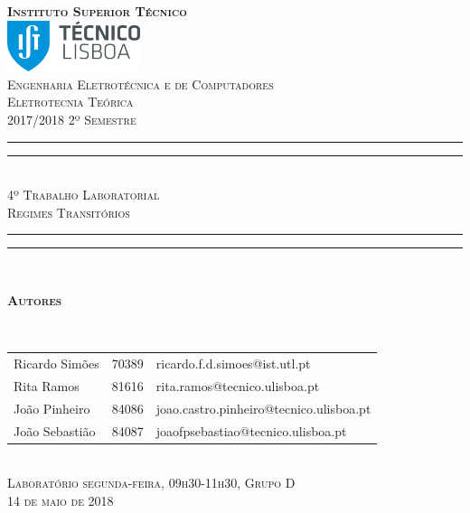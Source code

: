 \documentclass[a4paper, titlepage, portuguese]{article}
\begin{document}
	\begin{titlepage}
		\center
		\textsc{\bfseries\LARGE Instituto Superior Técnico}\\[1cm] %
		\includegraphics[height=1.5cm]{IST_Logo.pdf}\\[2.5cm]

		\textsc{\Large Engenharia Eletrotécnica e de Computadores}\\[0.5cm] %
		\textsc{\Large Eletrotecnia Teórica}\\[0.5cm] %
		\textsc{\large 2017/2018 2º Semestre}\\[2cm]

		\rule{\textwidth}{1.6pt}\vspace*{-\baselineskip}\vspace*{2pt} %
		\rule{\textwidth}{0.4pt}\\[\baselineskip] %
			\textsc{\Huge 4º Trabalho Laboratorial}\\[0.2cm]
			\bigskip
			\textsc{\Large Regimes Transitórios}\\[0.2cm]
		\rule{\textwidth}{0.4pt}\vspace*{-\baselineskip}\vspace{3.2pt} %
		\rule{\textwidth}{1.6pt}\\[6cm]

		\begin{minipage}{0.9\textwidth}
			\begin{flushleft} \large
				\begin{Large}\bfseries\textsc{Autores}\end{Large}\\[0.4cm]
				\begin{tabular}{l l l}
					Ricardo Simões	& 70389 & \normalsize ricardo.f.d.simoes@ist.utl.pt \\
					Rita Ramos			& 81616 & \normalsize rita.ramos@tecnico.ulisboa.pt \\
					João Pinheiro		& 84086 & \normalsize joao.castro.pinheiro@tecnico.ulisboa.pt \\
					João Sebastião	& 84087 & \normalsize joaofpsebastiao@tecnico.ulisboa.pt \\
				\end{tabular}
			\end{flushleft}
		\end{minipage}\\[0.5cm]

		\large \textsc{Laboratório segunda-feira, 09h30-11h30, Grupo D\\
		14 de maio de 2018}\\[1cm]
		\setcounter{page}{0}
	\end{titlepage}
\end{document}

